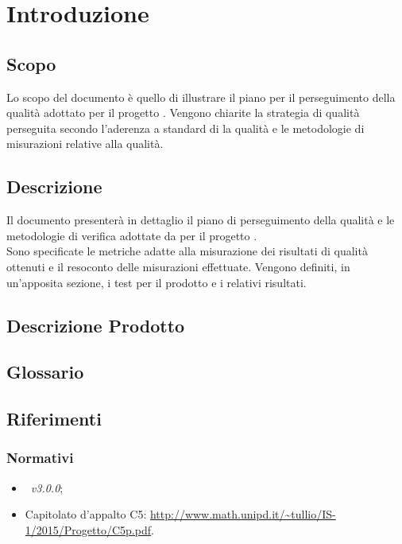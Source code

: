 \documentclass[12pt,a4paper]{article}
\begin{document}
	
	\section{Introduzione}	\label{intro}
	
	\subsection{Scopo}
	Lo scopo del documento è quello di illustrare il piano per il perseguimento della qualità adottato per il progetto \prj{}. Vengono chiarite la strategia di qualità perseguita secondo l'aderenza a standard di la qualità e le metodologie di misurazioni relative alla qualità.
	
	\subsection{Descrizione}
	Il documento presenterà in dettaglio il piano di perseguimento della qualità e le metodologie di verifica adottate da \nomeGruppo{} per il progetto \prj{}. \\
	Sono specificate le metriche adatte alla misurazione dei risultati di qualità ottenuti e il resoconto delle misurazioni effettuate. 
	Vengono definiti, in un'apposita sezione, i test per il prodotto  e i relativi risultati.
	
	\subsection{Descrizione Prodotto}
	\descrizioneProdotto
	
	\subsection{Glossario}
	\glossarioPrint
	
	\subsection{Riferimenti}
	
	\subsubsection{Normativi}
	\begin{itemize}
		\item \NdP\ \textit{v3.0.0};
		\item Capitolato d'appalto C5: \url{http://www.math.unipd.it/~tullio/IS-1/2015/Progetto/C5p.pdf}.
	\end{itemize}
	
\end{document}
